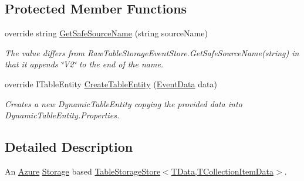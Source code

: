 \subsection*{Protected Member Functions}
\begin{DoxyCompactItemize}
\item 
override string \hyperlink{classCqrs_1_1Azure_1_1Storage_1_1Events_1_1TableStorageSnapshotStore_1_1RawTableStorageSnapshotStorer_a60d3f056786a231d63b756823d220cc9_a60d3f056786a231d63b756823d220cc9}{Get\+Safe\+Source\+Name} (string source\+Name)
\begin{DoxyCompactList}\small\item\em The value differs from Raw\+Table\+Storage\+Event\+Store.\+Get\+Safe\+Source\+Name(string) in that it appends \char`\"{}\+V2\char`\"{} to the end of the name. \end{DoxyCompactList}\item 
override I\+Table\+Entity \hyperlink{classCqrs_1_1Azure_1_1Storage_1_1Events_1_1TableStorageSnapshotStore_1_1RawTableStorageSnapshotStorer_ae1f2f98faf5254e44ff20acbdc72c874_ae1f2f98faf5254e44ff20acbdc72c874}{Create\+Table\+Entity} (\hyperlink{classCqrs_1_1Events_1_1EventData}{Event\+Data} data)
\begin{DoxyCompactList}\small\item\em Creates a new Dynamic\+Table\+Entity copying the provided {\itshape data}  into Dynamic\+Table\+Entity.\+Properties. \end{DoxyCompactList}\end{DoxyCompactItemize}


\subsection{Detailed Description}
An \hyperlink{namespaceCqrs_1_1Azure}{Azure} \hyperlink{namespaceCqrs_1_1Azure_1_1Storage}{Storage} based \hyperlink{classCqrs_1_1Azure_1_1BlobStorage_1_1Events_1_1TableStorageSnapshotStore_a9b35cccc8db03b41466526f60767ed5f_a9b35cccc8db03b41466526f60767ed5f}{Table\+Storage\+Store$<$\+T\+Data,\+T\+Collection\+Item\+Data$>$}. 



